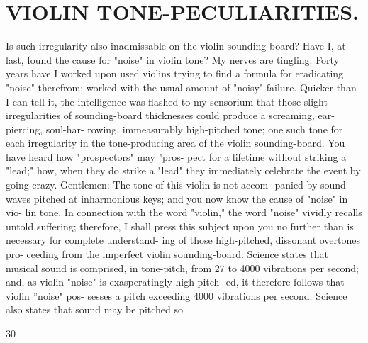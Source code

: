 \documentclass{article}
\begin{document}
\section*{VIOLIN TONE-PECULIARITIES.}
Is such irregularity also inadmissable on the violin sounding-board? Have I, at last, found the cause for "noise" in violin tone? My nerves are tingling. Forty years have I worked upon used violins trying to find a formula for eradicating "noise" therefrom; worked with the usual amount of "noisy" failure. Quicker than I can tell it, the intelligence was flashed to my sensorium that those slight irregularities of sounding-board thicknesses could produce a screaming, ear-piercing, soul-har- rowing, immeasurably high-pitched tone; one such tone for each irregularity in the tone-producing area of the violin sounding-board. You have heard how "prospectors" may "pros- pect for a lifetime without striking a "lead;" how, when they do strike a "lead" they immediately celebrate the event by going crazy. Gentlemen: The tone of this violin is not accom- panied by sound-waves pitched at inharmonious keys; and you now know the cause of "noise" in vio- lin tone. In connection with the word "violin," the word "noise" vividly recalls untold suffering; therefore, I shall press this subject upon you no further than is necessary for complete understand- ing of those high-pitched, dissonant overtones pro- ceeding from the imperfect violin sounding-board. Science states that musical sound is comprised, in tone-pitch, from 27 to 4000 vibrations per second; and, as violin "noise" is exasperatingly high-pitch- ed, it therefore follows that violin ''noise" pos- sesses a pitch exceeding 4000 vibrations per second. Science also states that sound may be pitched so

30
\end{document}
